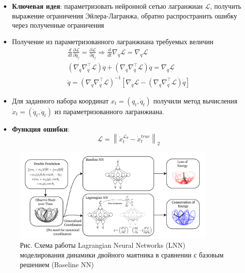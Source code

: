 \begin{itemize}
	\item \textbf{Ключевая идея}: параметризовать нейронной сетью лагранжиан $\mathcal{L}$, получить выражение ограничения Эйлера-Лагранжа, обратно распространить ошибку через полученные ограничения
	\item Получение из параметризованного лагранжиана требуемых величин	$$
	\begin{aligned}
	\frac{d}{d t} \frac{\partial \mathcal{L}}{\partial \dot{q}_{j}} =\frac{\partial \mathcal{L}}{\partial q_{j}}  \Rightarrow \frac{d}{d t} \nabla_{\dot{q}} \mathcal{L} =\nabla_{q} \mathcal{L} \\
	\left(\nabla_{\dot{q}} \nabla_{\dot{q}}^{\top} \mathcal{L}\right) \ddot{q}+\left(\nabla_{q} \nabla_{\dot{q}}^{\top} \mathcal{L}\right) \dot{q} =\nabla_{q} \mathcal{L} \\
	\ddot{q} =\left(\nabla_{\dot{q}} \nabla_{\dot{q}}^{\top} \mathcal{L}\right)^{-1}\left[\nabla_{q} \mathcal{L}-\left(\nabla_{q} \nabla_{\dot{q}}^{\top} \mathcal{L}\right) \dot{q}\right]
	\end{aligned}
	$$
	\item Для заданного набора координат $x_t = (q_t, \dot{q}_t)$ получили метод вычисления $\dot{x}_t = (\dot{q}_t, \ddot{q}_t)$ из параметризованного лагранжиана.
	\item \textbf{Функция ошибки}: $$\mathcal{L} = \left\|\dot{x}^{\mathcal{L_{\theta}}}_t -\dot{x}^{true}_t\right\|_{2}$$
\end{itemize}

\begin{figure}[h]
	\centering
	\includegraphics[width=0.9\textwidth]{chapters/severilov_s2/pics/lnn}
	\caption{Рис. Схема работы Lagrangian Neural Networks (LNN) моделирования динамики двойного маятника в сравнении с базовым решением (Baseline NN)}
\end{figure}

